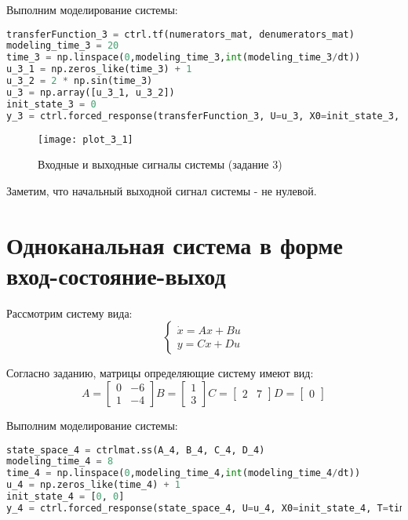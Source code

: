 Выполним моделирование системы:
\begin{lstlisting}[language=Python]
transferFunction_3 = ctrl.tf(numerators_mat, denumerators_mat)
modeling_time_3 = 20 
time_3 = np.linspace(0,modeling_time_3,int(modeling_time_3/dt))
u_3_1 = np.zeros_like(time_3) + 1
u_3_2 = 2 * np.sin(time_3)
u_3 = np.array([u_3_1, u_3_2])
init_state_3 = 0
y_3 = ctrl.forced_response(transferFunction_3, U=u_3, X0=init_state_3, T=time_3).outputs
\end{lstlisting}

\begin{figure}[h]
    \centering
    \texttt{[image: plot\_3\_1]}
    \caption{\label{fig:The-caption-1}Входные и выходные сигналы системы (задание 3)}
\end{figure}

Заметим, что начальный выходной сигнал системы - не нулевой.
\pagebreak

\section{Одноканальная система в форме вход-состояние-выход}
Рассмотрим систему вида:
\begin{equation}
    \begin{cases}
        \dot x = Ax + Bu \\
        y = Cx + Du
    \end{cases}
\end{equation}

Согласно заданию, матрицы определяющие систему имеют вид:
\begin{equation*}
    A = \begin{bmatrix}
        0 & -6   \\
        1 &  -4 
        \end{bmatrix}
        B = \begin{bmatrix}
            1  \\
            3
            \end{bmatrix}
        C = \begin{bmatrix}
            2 & 7 
            \end{bmatrix}
        D = \begin{bmatrix}
             0
            \end{bmatrix}
\end{equation*}

Выполним моделирование системы:
\begin{lstlisting}[language=Python]
state_space_4 = ctrlmat.ss(A_4, B_4, C_4, D_4)
modeling_time_4 = 8 
time_4 = np.linspace(0,modeling_time_4,int(modeling_time_4/dt))
u_4 = np.zeros_like(time_4) + 1
init_state_4 = [0, 0]
y_4 = ctrl.forced_response(state_space_4, U=u_4, X0=init_state_4, T=time_4).outputs
\end{lstlisting}


